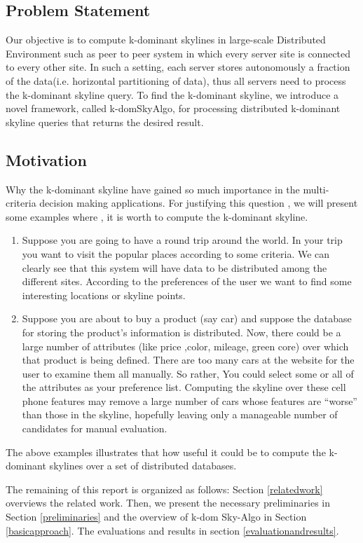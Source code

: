 \documentclass[twocolumn]{article}
\begin{document}
\subsection{Problem Statement}
Our objective is to compute k-dominant skylines in large-scale Distributed Environment such as peer to peer system in which every server site is connected to every other site. In such a setting, each server stores autonomously a fraction of the data(i.e. horizontal partitioning of data), thus all servers need to process the k-dominant skyline query. To find the k-dominant skyline, we introduce a novel framework, called k-domSkyAlgo, for processing distributed k-dominant skyline queries that returns the desired result. 
\subsection{Motivation}
Why the k-dominant skyline have gained so much importance in the multi-criteria decision making applications. For justifying this question , we will present some examples where , it is worth to compute the k-dominant skyline.
\begin{enumerate}
\item  Suppose you are going to have a round trip around the world. In your trip you want to visit the popular places according to some criteria. We can clearly see that this system will have data to be distributed among the different sites. According to the preferences of the user we want to find some interesting locations or skyline points.
\item  Suppose you are about to buy a product (say car) and suppose the database for storing the product’s information is distributed. Now, there could be a large number of attributes (like price ,color, mileage, green core) over which that product is being defined. There are too many cars at the website for the user to examine them all manually. So rather, You could select some or all of the attributes as your preference list. Computing the skyline over these cell phone features may remove a large number of cars whose features are “worse” than those in the skyline, hopefully leaving only a manageable number of candidates for manual evaluation. 
\end{enumerate}

The above examples illustrates that how useful it could be to compute the k-dominant skylines over a set of distributed databases.

The remaining of this report is organized as follows: Section \ref{relatedwork} overviews the related work. Then, we present the necessary preliminaries in Section \ref{preliminaries} and the overview of k-dom Sky-Algo in Section \ref{basicapproach}. The evaluations and results in section \ref{evaluationandresults}.
\end{document}
